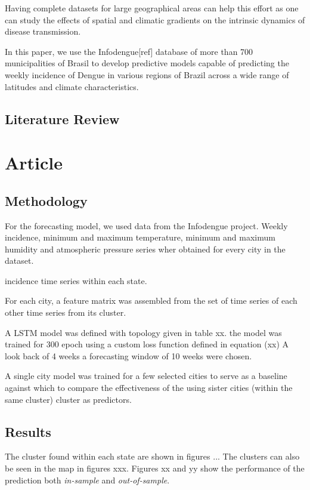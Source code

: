 \documentclass[12pt]{report}
\begin{document}
Having complete datasets for large geographical areas can help this effort as one can study the effects of spatial and climatic gradients on the intrinsic dynamics of disease transmission. 

In this paper, we use the Infodengue[ref] database of more than 700 municipalities of Brasil to develop predictive models capable of predicting the weekly incidence of Dengue in various regions of Brazil across a wide range of latitudes and climate characteristics.

\newpage
\section{Literature Review}

\newpage
\chapter{Article}

\section{Methodology}
For the forecasting model, we used data from the Infodengue project. Weekly 
incidence, minimum and maximum temperature, minimum and maximum humidity and 
atmospheric pressure series wher obtained for every city in the dataset.

incidence time series within each state.

For each city, a feature matrix was assembled from the set of time series of 
each other time series from its cluster.

A LSTM model was defined with topology given in table xx. the model was trained 
for 300 epoch using a custom loss function defined in equation (xx) A look back 
of 4 weeks a forecasting window of 10 weeks were chosen.

A single city model was trained for a few selected cities to serve as a 
baseline against which to compare the effectiveness of the using sister 
cities (within the same cluster) cluster as predictors.

\section{Results}
The cluster found within each state are shown in figures ... The clusters can 
also be seen in the map in figures xxx.
Figures xx and yy show the performance of the prediction  both \emph{in-sample} 
and  \emph{out-of-sample}.
\end{document}
